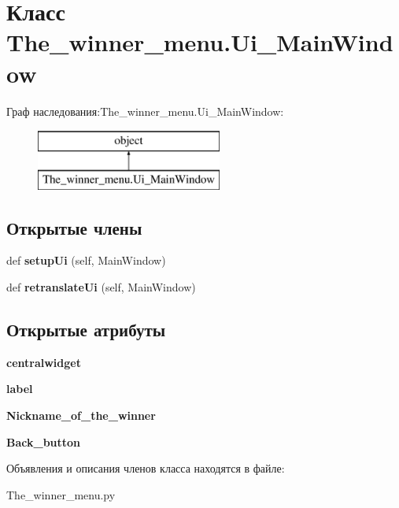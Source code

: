 \hypertarget{class_the__winner__menu_1_1_ui___main_window}{}\section{Класс The\+\_\+winner\+\_\+menu.\+Ui\+\_\+\+Main\+Window}
\label{class_the__winner__menu_1_1_ui___main_window}
Граф наследования\+:The\+\_\+winner\+\_\+menu.\+Ui\+\_\+\+Main\+Window\+:\begin{figure}[H]
\begin{center}
\leavevmode
\includegraphics[height=2.000000cm]{class_the__winner__menu_1_1_ui___main_window}
\end{center}
\end{figure}
\subsection*{Открытые члены}
\begin{DoxyCompactItemize}
\item 
\mbox{\label{class_the__winner__menu_1_1_ui___main_window_a7ebfd874ca04c468c3d15f8e654a6b77}} 
def {\bfseries setup\+Ui} (self, Main\+Window)
\item 
\mbox{\label{class_the__winner__menu_1_1_ui___main_window_a2ba5254444d8a4a865910ce76aa69f04}} 
def {\bfseries retranslate\+Ui} (self, Main\+Window)
\end{DoxyCompactItemize}
\subsection*{Открытые атрибуты}
\begin{DoxyCompactItemize}
\item 
\mbox{\label{class_the__winner__menu_1_1_ui___main_window_aec28cc4218b7b9e58c5f0c76ff0d191f}} 
{\bfseries centralwidget}
\item 
\mbox{\label{class_the__winner__menu_1_1_ui___main_window_a138cbf7e0c061c2c28214da0b88be9e9}} 
{\bfseries label}
\item 
\mbox{\label{class_the__winner__menu_1_1_ui___main_window_a5e63608255d2c4f0260486e3f46a6c11}} 
{\bfseries Nickname\+\_\+of\+\_\+the\+\_\+winner}
\item 
\mbox{\label{class_the__winner__menu_1_1_ui___main_window_a12c01842c562785b6a4072fddb2fee14}} 
{\bfseries Back\+\_\+button}
\end{DoxyCompactItemize}


Объявления и описания членов класса находятся в файле\+:\begin{DoxyCompactItemize}
\item 
The\+\_\+winner\+\_\+menu.\+py\end{DoxyCompactItemize}
